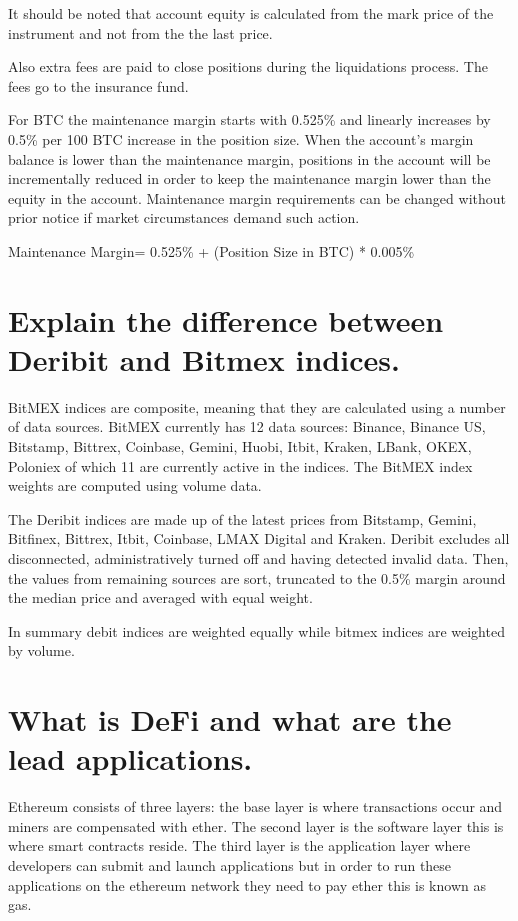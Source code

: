It should be noted that account equity is calculated from the mark price of the instrument and not from the the last price.

Also extra fees are paid to close positions during the liquidations process. The fees go to the insurance fund.

For BTC the maintenance margin starts with 0.525\% and linearly increases by 0.5\% per 100 BTC increase in the position size. When the account's margin balance is lower than the maintenance margin, positions in the account will be incrementally reduced in order to keep the maintenance margin lower than the equity in the account. Maintenance margin requirements can be changed without prior notice if market circumstances demand such action.

 

Maintenance Margin= 0.525\% + (Position Size in BTC) * 0.005\%

\section{ Explain the difference between Deribit and Bitmex indices.}
BitMEX indices are composite, meaning that they are calculated using a number of data sources. BitMEX currently has 12 data sources: Binance, Binance US, Bitstamp, Bittrex, Coinbase, Gemini, Huobi, Itbit, Kraken, LBank, OKEX, Poloniex of which 11 are currently active in the indices. The BitMEX index weights are computed using volume data.

The Deribit indices are made up of the latest prices from Bitstamp, Gemini, Bitfinex, Bittrex,  Itbit, Coinbase, LMAX Digital and Kraken. Deribit excludes all disconnected, administratively turned off and having detected invalid data. Then, the values from remaining sources are sort, truncated to the 0.5\% margin around the median price and averaged with equal weight.

In summary debit indices are weighted equally while bitmex indices are weighted by volume.

    
\section{ What is DeFi and what are the lead applications.}

Ethereum consists of three layers: the base layer is where transactions occur  and miners are compensated with ether. The second layer is the software layer this is where smart contracts reside. The third layer is the application layer where developers can submit and launch applications but in order to run these applications on the ethereum network they need to pay ether this is known as gas. 

